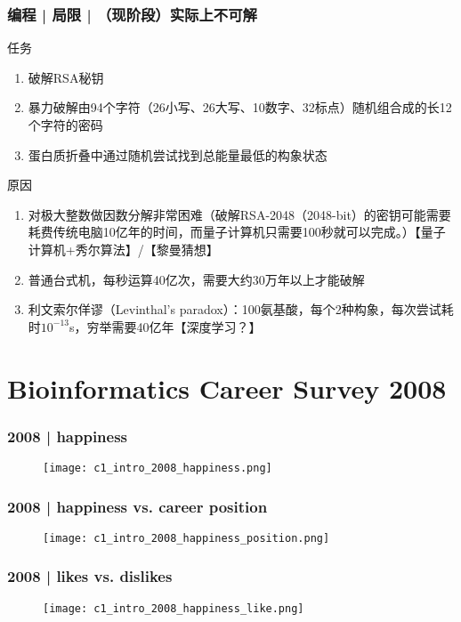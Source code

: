 \begin{frame}
  \frametitle{编程 | 局限 | （现阶段）实际上不可解}
  \begin{block}{任务}
    \begin{enumerate}
      \item<1-> 破解RSA秘钥
      \item<2-> 暴力破解由94个字符（26小写、26大写、10数字、32标点）随机组合成的长12个字符的密码
      \item<3-> 蛋白质折叠中通过随机尝试找到总能量最低的构象状态
    \end{enumerate}
  \end{block}
  \begin{block}{原因}
    \begin{enumerate}
      \item<1-> 对极大整数做因数分解非常困难（破解RSA-2048（2048-bit）的密钥可能需要耗费传统电脑10亿年的时间，而量子计算机只需要100秒就可以完成。）【量子计算机+秀尔算法】/【黎曼猜想】
      \item<2-> 普通台式机，每秒运算40亿次，需要大约30万年以上才能破解
      \item<3-> 利文索尔佯谬（Levinthal's paradox）：100氨基酸，每个2种构象，每次尝试耗时$10^{-13}$s，穷举需要40亿年【深度学习？】
    \end{enumerate}
  \end{block}
\end{frame}

\section{Bioinformatics Career Survey 2008}
\begin{frame}
  \frametitle{2008 | happiness}
   \begin{figure}
     \centering
     \texttt{[image: c1\_intro\_2008\_happiness.png]}
   \end{figure}
\end{frame}

\begin{frame}
  \frametitle{2008 | happiness vs. career position}
   \begin{figure}
     \centering
     \texttt{[image: c1\_intro\_2008\_happiness\_position.png]}
   \end{figure}
\end{frame}

\begin{frame}
  \frametitle{2008 | likes vs. dislikes}
   \begin{figure}
     \centering
     \texttt{[image: c1\_intro\_2008\_happiness\_like.png]}
   \end{figure}
\end{frame}

